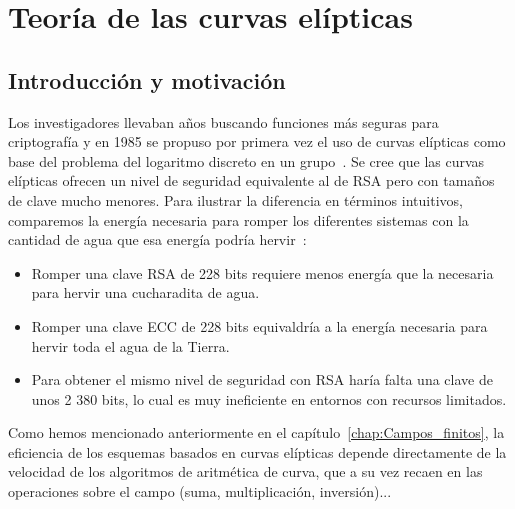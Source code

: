 \chapter{Teoría de las curvas elípticas}

\section{Introducción y motivación}
Los investigadores llevaban años buscando funciones más seguras para criptografía y en 1985 se propuso por primera vez el uso de curvas elípticas como base del problema del logaritmo discreto en un grupo~\cite{Koblitz1987,Miller1986}. Se cree que las curvas elípticas ofrecen un nivel de seguridad equivalente al de RSA pero con tamaños de clave mucho menores. Para ilustrar la diferencia en términos intuitivos, comparemos la energía necesaria para romper los diferentes sistemas con la cantidad de agua que esa energía podría hervir~\cite{Rickard2016,Lenstra2000}:
\begin{itemize}
  \item Romper una clave RSA de 228 bits requiere menos energía que la necesaria para hervir una cucharadita de agua.  
  \item Romper una clave ECC de 228 bits equivaldría a la energía necesaria para hervir toda el agua de la Tierra.  
  \item Para obtener el mismo nivel de seguridad con RSA haría falta una clave de unos 2 380 bits, lo cual es muy ineficiente en entornos con recursos limitados.  
\end{itemize}

Como hemos mencionado anteriormente en el capítulo~\ref{chap:Campos_finitos}, la eficiencia de los esquemas basados en curvas elípticas depende directamente de la velocidad de los algoritmos de aritmética de curva, que a su vez recaen en las operaciones sobre el campo (suma, multiplicación, inversión)...


